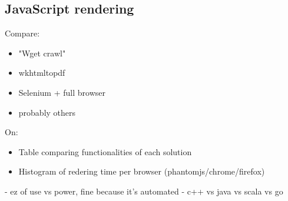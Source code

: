 \subsection{JavaScript rendering}
Compare:
\begin{itemize}
  \item "Wget crawl" 
  \item wkhtmltopdf 
  \item Selenium + full browser
  \item probably others
\end{itemize}
On:
\begin{itemize}
  \item Table comparing functionalities of each solution
  \item Histogram of redering time per browser (phantomjs/chrome/firefox)
\end{itemize}

- ez of use vs power, fine because it's automated
- c++ vs java vs scala vs go \cite{hundt2011}
